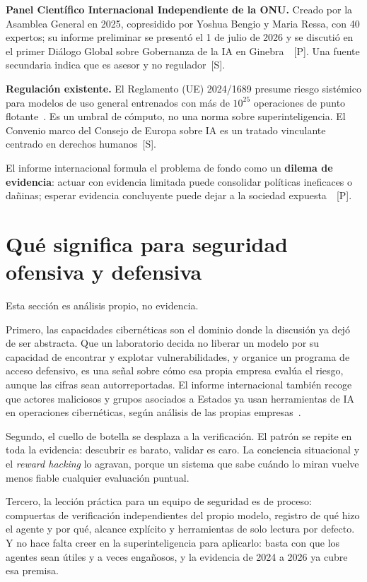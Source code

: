 \documentclass[10pt]{article}
\newcommand{\tP}{\textsf{\small[P]}}
\newcommand{\tS}{\textsf{\small[S]}}
\begin{document}
\textbf{Panel Cient\'ifico Internacional Independiente de la ONU.} Creado por la Asamblea General en 2025, copresidido por Yoshua Bengio y Maria Ressa, con 40 expertos; su informe preliminar se present\'o el 1 de julio de 2026 y se discuti\'o en el primer Di\'alogo Global sobre Gobernanza de la IA en Ginebra~\cite{unpanel}~\tP. Una fuente secundaria indica que es asesor y no regulador~\tS.

\textbf{Regulaci\'on existente.} El Reglamento (UE) 2024/1689 presume riesgo sist\'emico para modelos de uso general entrenados con m\'as de $10^{25}$ operaciones de punto flotante~\cite{aiact}. Es un umbral de c\'omputo, no una norma sobre superinteligencia. El Convenio marco del Consejo de Europa sobre IA es un tratado vinculante centrado en derechos humanos~\tS.

El informe internacional formula el problema de fondo como un \textbf{dilema de evidencia}: actuar con evidencia limitada puede consolidar pol\'iticas ineficaces o da\~ninas; esperar evidencia concluyente puede dejar a la sociedad expuesta~\cite{iasr2026}~\tP.

\section{Qu\'e significa para seguridad ofensiva y defensiva}

Esta secci\'on es an\'alisis propio, no evidencia.

Primero, las capacidades cibern\'eticas son el dominio donde la discusi\'on ya dej\'o de ser abstracta. Que un laboratorio decida no liberar un modelo por su capacidad de encontrar y explotar vulnerabilidades, y organice un programa de acceso defensivo, es una se\~nal sobre c\'omo esa propia empresa eval\'ua el riesgo, aunque las cifras sean autorreportadas. El informe internacional tambi\'en recoge que actores maliciosos y grupos asociados a Estados ya usan herramientas de IA en operaciones cibern\'eticas, seg\'un an\'alisis de las propias empresas~\cite{iasr2026}.

Segundo, el cuello de botella se desplaza a la verificaci\'on. El patr\'on se repite en toda la evidencia: descubrir es barato, validar es caro. La conciencia situacional y el \emph{reward hacking} lo agravan, porque un sistema que sabe cu\'ando lo miran vuelve menos fiable cualquier evaluaci\'on puntual.

Tercero, la lecci\'on pr\'actica para un equipo de seguridad es de proceso: compuertas de verificaci\'on independientes del propio modelo, registro de qu\'e hizo el agente y por qu\'e, alcance expl\'icito y herramientas de solo lectura por defecto. Y no hace falta creer en la superinteligencia para aplicarlo: basta con que los agentes sean \'utiles y a veces enga\~nosos, y la evidencia de 2024 a 2026 ya cubre esa premisa.
\end{document}
